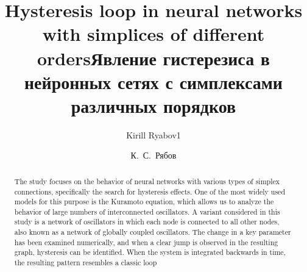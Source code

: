 \begin{englishtitle}
\title{Hysteresis loop in neural networks with simplices of different orders}
\author{Kirill Ryabov1}

\maketitle

\begin{abstract}
The study focuses on the behavior of neural networks with various types of simplex connections, specifically the search for hysteresis effects. One of the most widely used models for this purpose is the Kuramoto equation, which allows us to analyze the behavior of large numbers of interconnected oscillators. A variant considered in this study is a network of oscillators in which each node is connected to all other nodes, also known as a network of globally coupled oscillators. The change in a key parameter has been examined numerically, and when a clear jump is observed in the resulting graph, hysteresis can be identified. When the system is integrated backwards in time, the resulting pattern resembles a classic loop

\end{abstract}
\end{englishtitle}


\iffalse
\documentclass[12pt]{llncs}
\usepackage[T2A]{fontenc}
\usepackage[utf8]{inputenc}
\usepackage[english,russian]{babel}
\usepackage[russian]{nla}




\fi

\title{Явление гистерезиса в нейронных сетях с симплексами различных порядков }
\author{К.~С.~Рябов
} %

\maketitle

